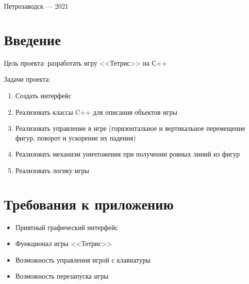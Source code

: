 \documentclass[a4paper,12pt]{article}
\begin{document}
\vfill

\begin{center}
    \large
    Петрозаводск --- 2021
\end{center}

\newpage

\tableofcontents

\newpage
\section*{Введение}

Цель проекта: разработать игру <<Тетрис>> на С++ 

Задачи проекта:
\begin{enumerate}
    \item Создать интерфейс
    \item Реализовать классы C++ для описания объектов игры
    \item Реализовать управление в игре (горизонтальное и вертикальное перемещение фигур, поворот и ускорение их падения)
    \item Реализовать механизм уничтожения при получении ровных линий из фигур
    \item Реализовать логику игры
\end{enumerate}


\section{Требования к приложению}
\begin{itemize}
    \item Приятный графический интерфейс
    \item Функционал игры <<Тетрис>> 
    \item Возможность управления игрой с клавиатуры
    \item Возможность перезапуска игры
\end{itemize}

\end{document}
